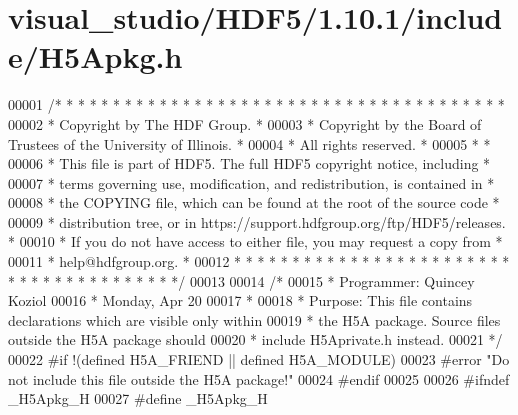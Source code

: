 \hypertarget{visual__studio_2_h_d_f5_21_810_81_2include_2_h5_apkg_8h_source}{}\section{visual\+\_\+studio/\+H\+D\+F5/1.10.1/include/\+H5\+Apkg.h}
\label{visual__studio_2_h_d_f5_21_810_81_2include_2_h5_apkg_8h_source}

\begin{DoxyCode}
00001 \textcolor{comment}{/* * * * * * * * * * * * * * * * * * * * * * * * * * * * * * * * * * * * * * *}
00002 \textcolor{comment}{ * Copyright by The HDF Group.                                               *}
00003 \textcolor{comment}{ * Copyright by the Board of Trustees of the University of Illinois.         *}
00004 \textcolor{comment}{ * All rights reserved.                                                      *}
00005 \textcolor{comment}{ *                                                                           *}
00006 \textcolor{comment}{ * This file is part of HDF5.  The full HDF5 copyright notice, including     *}
00007 \textcolor{comment}{ * terms governing use, modification, and redistribution, is contained in    *}
00008 \textcolor{comment}{ * the COPYING file, which can be found at the root of the source code       *}
00009 \textcolor{comment}{ * distribution tree, or in https://support.hdfgroup.org/ftp/HDF5/releases.  *}
00010 \textcolor{comment}{ * If you do not have access to either file, you may request a copy from     *}
00011 \textcolor{comment}{ * help@hdfgroup.org.                                                        *}
00012 \textcolor{comment}{ * * * * * * * * * * * * * * * * * * * * * * * * * * * * * * * * * * * * * * */}
00013 
00014 \textcolor{comment}{/*}
00015 \textcolor{comment}{ * Programmer:  Quincey Koziol}
00016 \textcolor{comment}{ *              Monday, Apr 20}
00017 \textcolor{comment}{ *}
00018 \textcolor{comment}{ * Purpose:     This file contains declarations which are visible only within}
00019 \textcolor{comment}{ *              the H5A package.  Source files outside the H5A package should}
00020 \textcolor{comment}{ *              include H5Aprivate.h instead.}
00021 \textcolor{comment}{ */}
00022 \textcolor{preprocessor}{#if !(defined H5A\_FRIEND || defined H5A\_MODULE)}
00023 \textcolor{preprocessor}{#error "Do not include this file outside the H5A package!"}
00024 \textcolor{preprocessor}{#endif}
00025 
00026 \textcolor{preprocessor}{#ifndef \_H5Apkg\_H}
00027 \textcolor{preprocessor}{#define \_H5Apkg\_H}

\end{DoxyCode}
